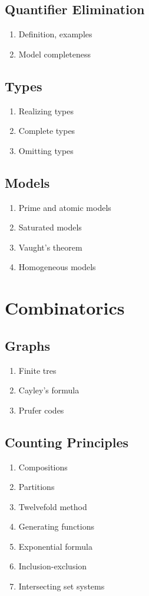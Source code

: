 \documentclass{article}
\begin{document}
\subsection{Quantifier Elimination} 
\begin{enumerate}
  \item Definition, examples
  \item Model completeness
\end{enumerate}

\subsection{Types} 
\begin{enumerate}
  \item Realizing types
  \item Complete types
  \item Omitting types
\end{enumerate}

\subsection{Models} 
\begin{enumerate}
  \item Prime and atomic models
  \item Saturated models
  \item Vaught's theorem
  \item Homogeneous models
\end{enumerate}

\section{Combinatorics}
\subsection{Graphs}
  \begin{enumerate}
    \item Finite tres
    \item Cayley's formula
    \item Prufer codes
  \end{enumerate}

\subsection{Counting Principles}
  \begin{enumerate}
    \item Compositions
    \item Partitions
    \item Twelvefold method
    \item Generating functions
    \item Exponential formula 
    \item Inclusion-exclusion
    \item Intersecting set systems
  \end{enumerate}
\end{document}
